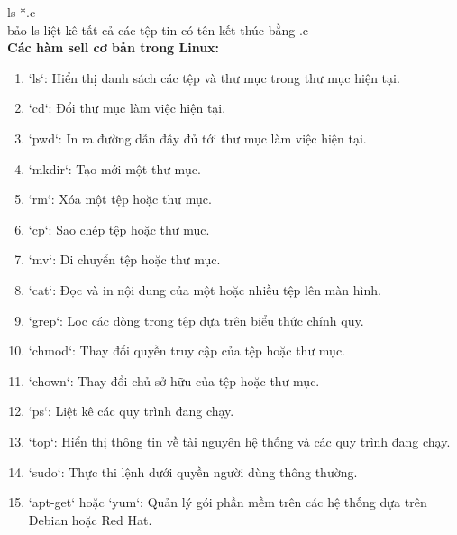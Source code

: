 \documentclass[12pt,a4paper]{article}
\begin{document}
ls *.c\\

bảo ls liệt kê tất cả các tệp tin có tên kết thúc bằng .c\\

\textbf{Các hàm sell cơ bản trong Linux:}\\

\begin{enumerate}
	\item `ls`: Hiển thị danh sách các tệp và thư mục trong thư mục hiện tại.
	\item `cd`: Đổi thư mục làm việc hiện tại.
	\item `pwd`: In ra đường dẫn đầy đủ tới thư mục làm việc hiện tại.
	\item `mkdir`: Tạo mới một thư mục.
	\item `rm`: Xóa một tệp hoặc thư mục.
	\item `cp`: Sao chép tệp hoặc thư mục.
	\item `mv`: Di chuyển tệp hoặc thư mục.
	\item `cat`: Đọc và in nội dung của một hoặc nhiều tệp lên màn hình.
	\item `grep`: Lọc các dòng trong tệp dựa trên biểu thức chính quy.
	\item `chmod`: Thay đổi quyền truy cập của tệp hoặc thư mục.
	\item `chown`: Thay đổi chủ sở hữu của tệp hoặc thư mục.
	\item `ps`: Liệt kê các quy trình đang chạy.
	\item `top`: Hiển thị thông tin về tài nguyên hệ thống và các quy trình đang chạy.
	\item `sudo`: Thực thi lệnh dưới quyền người dùng thông thường.
	\item `apt-get` hoặc `yum`: Quản lý gói phần mềm trên các hệ thống dựa trên Debian hoặc Red Hat.
\end{enumerate}
\end{document}
